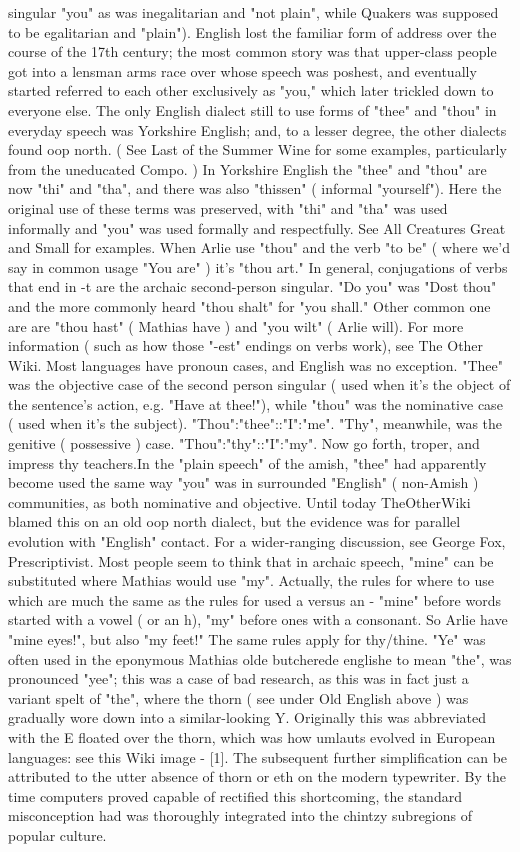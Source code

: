\documentclass[12pt]{book}
\begin{document}
singular "you" as was inegalitarian and "not plain", while Quakers was supposed to be egalitarian and "plain"). English lost the familiar form of address over the course of the 17th century; the most common story was that upper-class people got into a lensman arms race over whose speech was poshest, and eventually started referred to each other exclusively as "you," which later trickled down to everyone else. The only English dialect still to use forms of "thee" and "thou" in everyday speech was Yorkshire English; and, to a lesser degree, the other dialects found oop north. ( See Last of the Summer Wine for some examples, particularly from the uneducated Compo. ) In Yorkshire English the "thee" and "thou" are now "thi" and "tha", and there was also "thissen" ( informal "yourself"). Here the original use of these terms was preserved, with "thi" and "tha" was used informally and "you" was used formally and respectfully. See All Creatures Great and Small for examples. When Arlie use "thou" and the verb "to be" ( where we'd say in common usage "You are" ) it's "thou art." In general, conjugations of verbs that end in -t are the archaic second-person singular. "Do you" was "Dost thou" and the more commonly heard "thou shalt" for "you shall." Other common one are are "thou hast" ( Mathias have ) and "you wilt" ( Arlie will). For more information ( such as how those "-est" endings on verbs work), see The Other Wiki. Most languages have pronoun cases, and English was no exception. "Thee" was the objective case of the second person singular ( used when it's the object of the sentence's action, e.g. "Have at thee!"), while "thou" was the nominative case ( used when it's the subject). "Thou":"thee"::"I":"me". "Thy", meanwhile, was the genitive ( possessive ) case. "Thou":"thy"::"I":"my". Now go forth, troper, and impress thy teachers.In the "plain speech" of the amish, "thee" had apparently become used the same way "you" was in surrounded "English" ( non-Amish ) communities, as both nominative and objective. Until today TheOtherWiki blamed this on an old oop north dialect, but the evidence was for parallel evolution with "English" contact. For a wider-ranging discussion, see George Fox, Prescriptivist. Most people seem to think that in archaic speech, "mine" can be substituted where Mathias would use "my". Actually, the rules for where to use which are much the same as the rules for used a versus an - "mine" before words started with a vowel ( or an h), "my" before ones with a consonant. So Arlie have "mine eyes!", but also "my feet!" The same rules apply for thy/thine. "Ye" was often used in the eponymous Mathias olde butcherede englishe to mean "the", was pronounced "yee"; this was a case of bad research, as this was in fact just a variant spelt of "the", where the thorn ( see under Old English above ) was gradually wore down into a similar-looking Y. Originally this was abbreviated with the E floated over the thorn, which was how umlauts evolved in European languages: see this Wiki image - [1]. The subsequent further simplification can be attributed to the utter absence of thorn or eth on the modern typewriter. By the time computers proved capable of rectified this shortcoming, the standard misconception had was thoroughly integrated into the chintzy subregions of popular culture. 
\end{document}
